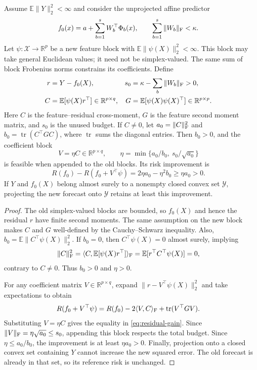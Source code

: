 \begin{proposition}
\label{prop:residual-gain}
Assume $\mathbb E\|Y\|_2^2<\infty$ and consider the unprojected affine
predictor
\[
 f_0(x)=a+\sum_{b=1}^sW_b^\top\Phi_b(x),
 \qquad \sum_{b=1}^s\|W_b\|_{\rm F}<\kappa.
\]
Let $\psi:\mathcal X\to\mathbb R^p$ be a new feature block with
$\mathbb E\|\psi(X)\|_2^2<\infty$. This block may take general
Euclidean values; it need not be simplex-valued. The same sum of block
Frobenius norms constrains its coefficients. Define
\begin{align*}
 r&=Y-f_0(X),
 &s_0&=\kappa-\sum_b\|W_b\|_{\rm F}>0,\\
 C&=\mathbb E[\psi(X)r^\top]\in\mathbb R^{p\times q},
 &G&=\mathbb E[\psi(X)\psi(X)^\top]\in\mathbb R^{p\times p}.
\end{align*}
Here $C$ is the feature--residual cross-moment, $G$ is the feature second
moment matrix, and $s_0$ is the unused budget. If $C\ne0$, let
$a_0=\|C\|_{\rm F}^2$ and $b_0=\operatorname{tr}(C^\top GC)$, where
$\operatorname{tr}$ sums the diagonal entries. Then $b_0>0$, and the
coefficient block
\[
 V=\eta C\in\mathbb R^{p\times q},\qquad
 \eta=\min\{a_0/b_0,\ s_0/\sqrt{a_0}\}
\]
is feasible when appended to the old blocks. Its risk improvement is
\begin{equation}
 R(f_0)-R(f_0+V^\top\psi)
       =2\eta a_0-\eta^2b_0\geq\eta a_0>0.
 \label{eq:residual-gain}
\end{equation}
If $Y$ and $f_0(X)$ belong almost surely to a nonempty closed convex set
$\mathcal Y$, projecting the new forecast onto $\mathcal Y$ retains at
least this improvement.
\end{proposition}

\begin{proof}
The old simplex-valued blocks are bounded, so $f_0(X)$ and hence the
residual $r$ have finite second moments. The same assumption on the new
block makes $C$ and $G$ well-defined by the Cauchy--Schwarz inequality. Also,
$b_0=\mathbb E\|C^\top\psi(X)\|_2^2$. If $b_0=0$, then
$C^\top\psi(X)=0$ almost surely, implying
\[
 \|C\|_{\rm F}^2
 =\langle C,\mathbb E[\psi(X)r^\top]\rangle_{\rm F}
 =\mathbb E[r^\top C^\top\psi(X)]=0,
\]
contrary to $C\ne0$. Thus $b_0>0$ and $\eta>0$.

For any coefficient matrix $V\in\mathbb R^{p\times q}$, expand
$\|r-V^\top\psi(X)\|_2^2$ and take expectations to obtain
\[
 R(f_0+V^\top\psi)=R(f_0)-2\langle V,C\rangle_{\rm F}
                         +\operatorname{tr}(V^\top GV).
\]
Substituting $V=\eta C$ gives the equality in
\eqref{eq:residual-gain}. Since
$\|V\|_{\rm F}=\eta\sqrt{a_0}\leq s_0$, appending this block respects
the total budget. Since $\eta\leq a_0/b_0$, the improvement is at least
$\eta a_0>0$. Finally, projection onto a closed convex set containing
$Y$ cannot increase the new squared error. The old forecast is already
in that set, so its reference risk is unchanged.
\end{proof}

